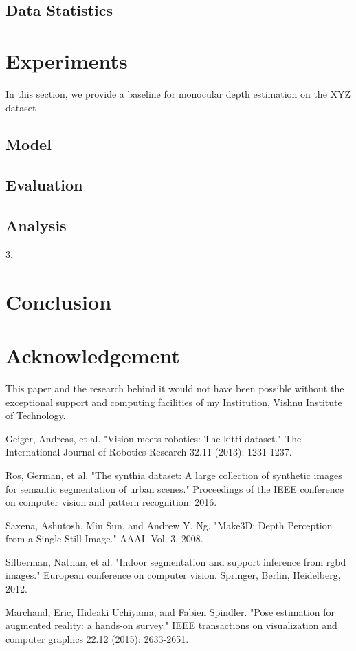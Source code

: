 \documentclass{article}
\begin{document}
\subsection{Data Statistics}


\section{Experiments}
In this section, we provide a baseline for monocular depth estimation on the XYZ dataset
\subsection{Model}
\subsection{Evaluation}
\subsection{Analysis}

3. 
\section{Conclusion}
\section{Acknowledgement}
This paper and the research behind it would not have been possible without the exceptional support and computing facilities of my Institution, Vishnu Institute of Technology.
\begin{thebibliography}{10}
 Geiger, Andreas, et al. "Vision meets robotics: The kitti dataset." The International Journal of Robotics Research 32.11 (2013): 1231-1237.

 Ros, German, et al. "The synthia dataset: A large collection of synthetic images for semantic segmentation of urban scenes." Proceedings of the IEEE conference on computer vision and pattern recognition. 2016.

 Saxena, Ashutosh, Min Sun, and Andrew Y. Ng. "Make3D: Depth Perception from a Single Still Image." AAAI. Vol. 3. 2008.

 Silberman, Nathan, et al. "Indoor segmentation and support inference from rgbd images." European conference on computer vision. Springer, Berlin, Heidelberg, 2012.

 Marchand, Eric, Hideaki Uchiyama, and Fabien Spindler. "Pose estimation for augmented reality: a hands-on survey." IEEE transactions on visualization and computer graphics 22.12 (2015): 2633-2651.

\end{thebibliography}
\end{document}
